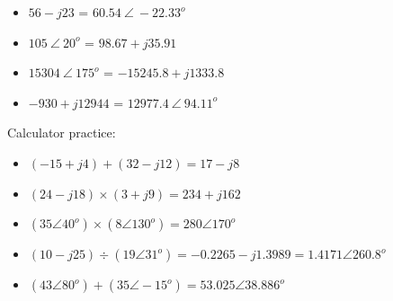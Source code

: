 
\begin{itemize}
\item{} $56 - j23$ = $60.54 \> \angle \> -22.33^o$ 
\vskip 10pt
\item{} $105 \> \angle \> 20^o$ = $98.67 + j35.91$
\vskip 10pt
\item{} $15304 \> \angle \> 175^o$ = $-15245.8 + j1333.8$
\vskip 10pt
\item{} $-930 + j12944$ = $12977.4 \> \angle \> 94.11^o$
\end{itemize}







\noindent
Calculator practice:

\begin{itemize}
\item{} $(-15 + j4) + (32 - j12) = 17 - j8$
\vskip 10pt
\item{} $(24 - j18) \times (3 + j9) = 234 + j162$
\vskip 10pt
\item{} $(35 \angle 40^o) \times (8 \angle 130^o) = 280 \angle 170^o$
\vskip 10pt
\item{} $(10 - j25) \div (19 \angle 31^o) = -0.2265 - j1.3989 = 1.4171 \angle 260.8^o$
\vskip 10pt
\item{} $(43 \angle 80^o) + (35 \angle -15^o) = 53.025 \angle 38.886^o$
\end{itemize}





